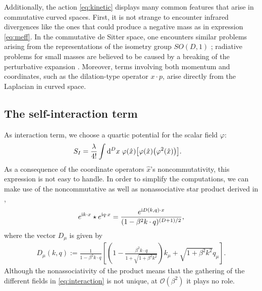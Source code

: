 \documentclass[a4paper,10pt]{amsart}
\begin{document}
Additionally, the action \eqref{eq:kinetic} displays many common features that arise in commutative curved spaces.
First, it is not strange to encounter infrared divergences like the ones that could produce a negative mass as
in expression \eqref{eq:meff}.
In the commutative de Sitter space, one encounters similar problems arising from the representations of the isometry group $SO(D,1)$  \cite{Marolf:2012kh}; radiative problems for small masses are believed to be caused by a breaking of the perturbative expansion \cite{LopezNacir:2019ord}.
Moreover, terms involving both momentum and coordinates, such as the dilation-type operator $x\cdot p$,
arise directly from the Laplacian in curved space.



\subsection{The self-interaction term}
As interaction term, we choose a quartic potential for the scalar field $\varphi$:
\begin{align}\label{eq:interaction}
\begin{split}
 S_I&=\frac{\lambda}{4!}\int {\rm d}^Dx \; \varphi(\hat{x}) \big[ \varphi(\hat{x}) \big(\varphi^2(\hat{x})\big)\big].
 \end{split}
 \end{align}
As a consequence of the coordinate operators $\hat x$'s noncommutativity, this expression is not easy to handle.
In order to simplify the computations, we can make use of the noncommutative as well as nonassociative star product derived in \cite{Meljanac:2017ikx},
\begin{align}
 e^{{\rm i}k\cdot x}\star e^{{\rm i} q \cdot x}=\frac{e^{{\rm i}D(k, q)\cdot x}}{(1-\beta^2 k\cdot q)^{(D+1)/2}},
\end{align}
where the vector $D_{\mu}$ is given by
\begin{align}
 D_{\mu}(k,q):=\frac{1}{1-\beta^2 k \cdot q} \left[\left(1- \frac{\beta^2 k \cdot q}{1+\sqrt{1+\beta^2 k^2}}\right)k_{\mu}+ \sqrt{1+\beta^2 k^2} q_{\mu}\right].
\end{align}
Although the nonassociativity of the product means that the gathering of the different fields  in \eqref{eq:interaction} is not unique,
at  $\mathcal{O}(\beta^2)$ it plays no role.
\end{document}
